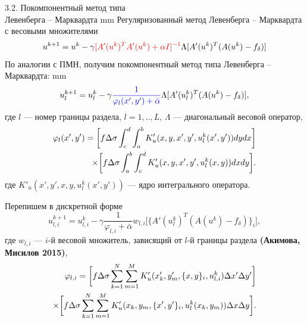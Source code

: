 \documentclass[10pt,pdf, mathserif, hyperref={unicode}]{beamer}
\begin{document}
\begin{frame}{3.2. Покомпонентный метод типа \\ Левенберга -- Марквардта}
	 mm
	Регуляризованный метод Левенберга -- Марквардта с весовыми множителями %
	$$	u^{k+1}=u^k-\gamma{\color{red}[A'(u^k)^T A'(u^k)+\alpha I]^{-1} }\Lambda[A'(u^k)^T(A(u^k)-f_\delta)]$$
	По аналогии с ПМН, получим покомпонентный метод типа Левенберга -- Марквардта:
	 mm
	$$ u_l^{k+1}=u_l^k-\gamma{\color{blue}\frac{1}{\varphi_l(x',y')+\bar{\alpha}}}\Lambda[ A'(u_l^k)^T(A(u^k)-f_\delta)],$$
	где $l$ --- номер границы раздела, $l=1,..,L$, $\Lambda$ --- диагональный весовой оператор, 
	\begin{equation*}
	\begin{aligned}
	\varphi_l(x',y')=\bigg[ f\Delta\sigma\int_{c}^{d}\int_{a}^{b}
	K'_u(x,y, x', y', u_l^k(x',y'))dydx\bigg] \notag \\ \times\bigg[f\Delta\sigma\int_{a}^{b}\int_{c}^{d}K'_u(x,y, x',y',u_l^k(x,y))dxdy\bigg]. 
	\end{aligned}
	\end{equation*} 
	где $K'_u(x',y', x, y, u_l^k(x',y'))$ --- ядро интегрального оператора. %
	\let\thefootnote\relax\let\thefootnote\relax{}

\end{frame}
\begin{frame}
	Перепишем в дискретной форме
	\begin{equation*}\label{comp_lm_meth_disc}
	u_{l,i}^{k+1}=u_{l,i}^k-\gamma\frac{1}{\varphi_{l,i}+\bar{\alpha}}w_{l,i}\bigg[ \{A'(u_l^k)^T(A(u^k)-f_\delta)\}_i\bigg],
	\end{equation*}
	где $w_{l,i}$ --- $i$-й весовой множитель, зависящий от $l$-й границы раздела \textbf{\color{red}(Акимова, Мисилов 2015)},
	\begin{equation*}
	\begin{aligned}
	\varphi_{l,i}=\bigg[ f\Delta\sigma\sum\limits_{k=1}^{N}
	\sum\limits_{m=1}^{M}
	K'_u(x'_k,y'_m, \{x, y\}_i, u_{l,i}^k) \Delta x' \Delta y'\bigg] \notag \\ \times\bigg[f\Delta\sigma\sum\limits_{k=1}^{N}
	\sum\limits_{m=1}^{M}K'_u(x_k,y_m, \{x',y'\}_i,u_l^k(x_k,y_m))\Delta x \Delta y\bigg]. 
	\end{aligned}
	\end{equation*}
	\let\thefootnote\relax\let\thefootnote\relax{}
\end{frame}
\end{document}
